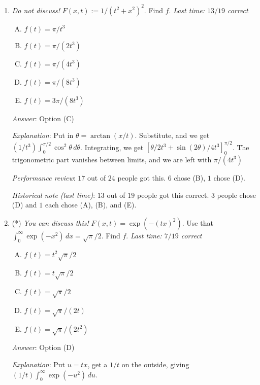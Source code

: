 \documentclass[10pt]{amsart}
\begin{document}
\begin{enumerate}
  {\em Performance review}: $19$ out of $24$ people got this. $3$
  chose (B) and $2$ chose (C).

  {\em Historical note (last time)}: $13$ out of $19$ people got this
  correct. $2$ people each chose (B), (C), and (D).

\item {\em Do not discuss!} $F(x,t) := 1/(t^2 + x^2)^2$. Find $f$. {\em Last time: $13/19$ correct}

  \begin{enumerate}[(A)]
  \item $f(t) = \pi/t^3$
  \item $f(t) = \pi/(2t^3)$
  \item $f(t) = \pi/(4t^3)$
  \item $f(t) = \pi/(8t^3)$
  \item $f(t) = 3\pi/(8t^3)$
  \end{enumerate}

  {\em Answer}: Option (C)

  {\em Explanation}: Put in $\theta = \arctan(x/t)$. Substitute, and
  we get $(1/t^3) \int_0^{\pi/2} \cos^2\theta \,
  d\theta$. Integrating, we get $[\theta/2t^3 +
  \sin(2\theta)/4t^3]_0^{\pi/2}$. The trigonometric part vanishes
  between limits, and we are left with $\pi/(4t^3)$

  {\em Performance review}: $17$ out of $24$ people got this. $6$
  chose (B), $1$ chose (D).

  {\em Historical note (last time)}: $13$ out of $19$ people got this
  correct. $3$ people chose (D) and $1$ each chose (A), (B), and (E).

\item (*) {\em You can discuss this!} $F(x,t) = \exp(-(tx)^2)$. Use that
  $\int_0^\infty \exp(-x^2) \, dx= \sqrt{\pi}/2$. Find $f$. {\em Last
  time: $7/19$ correct}

  \begin{enumerate}[(A)]
  \item $f(t) = t^2\sqrt{\pi}/2$
  \item $f(t) = t\sqrt{\pi}/2$
  \item $f(t) = \sqrt{\pi}/2$
  \item $f(t) = \sqrt{\pi}/(2t)$
  \item $f(t) = \sqrt{\pi}/(2t^2)$
  \end{enumerate}

  {\em Answer}: Option (D)

  {\em Explanation}: Put $u = tx$, get a $1/t$ on the outside, giving
  $(1/t) \int_0^\infty \exp(-u^2) \, du$.


\end{enumerate}
\end{document}
